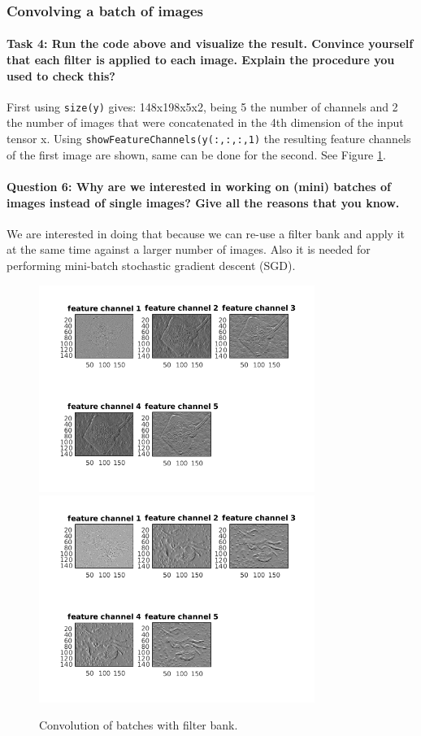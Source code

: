 \documentclass[12pt]{article}
\begin{document}
\subsubsection{Convolving a batch of images}
\paragraph{Task 4: Run the code above and visualize the result. Convince yourself that each filter is applied to each image. Explain the procedure you used to check this?} First using \texttt{size(y)} gives: 148x198x5x2, being 5 the number of channels and 2 the number of images that were concatenated in the 4th dimension of the input tensor x. Using \texttt{showFeatureChannels(y(:,:,:,1)} the resulting feature channels of the first image are shown, same can be done for the second. See Figure \ref{fig:113}.

\paragraph{Question 6: Why are we interested in working on (mini) batches of images instead of single images? Give all the reasons that you know.} We are interested in doing that because we can re-use a filter bank and apply it at the same time against a larger number of images. Also it is needed for performing mini-batch stochastic gradient descent (SGD).
\begin{figure}[htbp]
 \centering
 \includegraphics[width=0.8\textwidth]{113a}
 \includegraphics[width=0.8\textwidth]{113b}
 \caption{Convolution of batches with filter bank.}
 \label{fig:113}
\end{figure}
\end{document}
